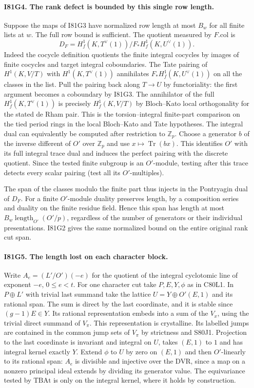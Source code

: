 \paragraph{I81G4. The rank defect is bounded by this single row length.}
Suppose the maps of I81G3 have normalized row length at most
$B_w$ for all finite lists at $w$. The full row bound is sufficient.
The quotient measured by $F.\mathrm{col}$ is
\[
 D_F=H_f^1(K,T^\vee(1))/F_* H_f^1(K,U^\vee(1)).
\]
Indeed the cocycle definition quotients the finite integral cocycles
by images of finite cocycles and target integral coboundaries.
The Tate pairing of $H^1(K,V/T)$ with $H^1(K,T^\vee(1))$
annihilates $F_* H_f^1(K,U^\vee(1))$ on all the classes in the
list. Pull the pairing back along $T\to U$ by functoriality:
the first argument becomes a coboundary by I81G3. The annihilator
of the full $H_f^1(K,T^\vee(1))$ is precisely $H_f^1(K,V/T)$
by Bloch--Kato local orthogonality for the stated de Rham pair.
This is the torsion--integral finite-part comparison on the tied
period rings in the local Bloch--Kato and Tate hypotheses. The
integral dual can equivalently be computed after restriction to
$\mathbb Z_p$. Choose a generator $b$ of the inverse different
of $O'$ over $\mathbb Z_p$ and use $x\mapsto\operatorname{Tr}(bx)$.
This identifies $O'$ with its full integral trace dual and induces
the perfect pairing with the discrete quotient. Since the tested
finite subgroup is an $O'$-module, testing after this trace detects
every scalar pairing (test all its $O'$-multiples).

The span of the classes modulo the finite part thus injects in
the Pontryagin dual of $D_F$. For a finite $O'$-module duality
preserves length, by a composition series and duality on the
finite residue field. Hence this span has length at most
$B_w\operatorname{length}_{O'}(O'/p)$, regardless of the number
of generators or their individual presentations. I81G2 gives
the same normalized bound on the entire original rank cut span.

\paragraph{I81G5. The length lost on each character block.}
Write $A_e=(L'/O')(-e)$ for the quotient of the integral cyclotomic
line of exponent $-e$, $0\le e<t$. For one character cut take
$P,E,Y,\phi$ as in C80L1. In $P\oplus L'$ with trivial last
summand take the lattice $U=Y\oplus O'(E,1)$ and its rational
span. The sum is direct by the last coordinate, and it is stable
since $(g-1)E\in Y$. Its rational representation embeds into a sum
of the $V_x$, using the trivial direct summand of $V_\pi$. This
representation is crystalline. Its labelled jumps are contained
in the common jump sets of $V_\pi$ by strictness and S80J1.
Projection to the last coordinate is invariant and integral on $U$,
takes $(E,1)$ to $1$ and has integral kernel exactly $Y$.
Extend $\phi$ to $U$ by zero on $(E,1)$ and then $O'$-linearly
to its rational span: $A_e$ is divisible and injective over the
DVR, since a map on a nonzero principal ideal extends by dividing
its generator value. The equivariance tested by $\mathrm{TBAt}$
is only on the integral kernel, where it holds by construction.


